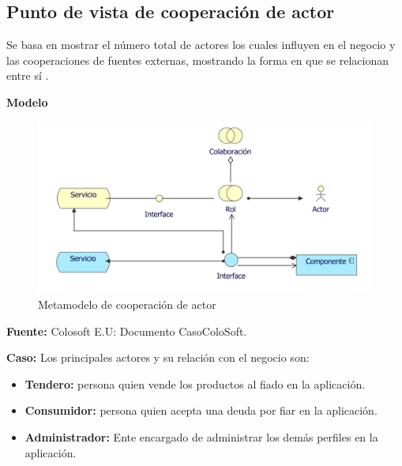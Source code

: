 	\subsection{Punto de vista de cooperación de actor}
	{Se  basa en mostrar el número total de actores los cuales influyen en el negocio y las cooperaciones de fuentes externas, mostrando la forma en que se relacionan entre sí \cite{archimate}.\\
	\newpage
		
		\textbf{Modelo}\\
		\begin{figure}[H]
			\centering
			\includegraphics[width=0.8\linewidth]{development/cooperacionactor.png}
			\caption{Metamodelo de cooperación de actor}
		\end{figure}
		\begin{center}
			\textbf{Fuente:} Colosoft E.U: Documento CasoColoSoft.
		\end{center}
		\hfill \break
		
		\textbf{Caso:} Los principales actores y su relación con el negocio son:
		
		\begin{itemize}
			\item \textbf{Tendero:} persona quien vende los productos al fiado en la aplicación.
			
			\item \textbf{Consumidor:} persona quien acepta una deuda por fiar en la aplicación.
			
			\item \textbf{Administrador:} Ente encargado de administrar los demás perfiles en la aplicación.
			
		\end{itemize}
		
}
